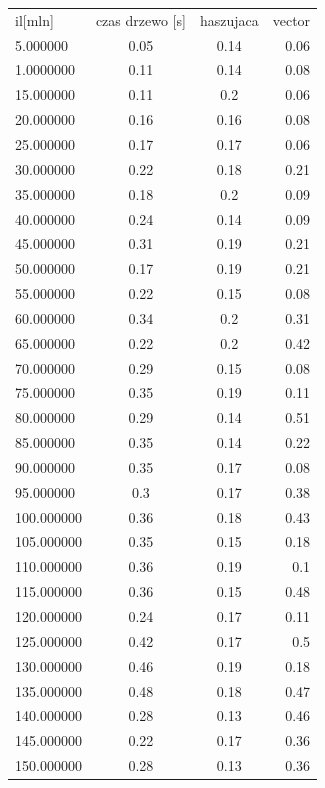 \documentclass[a4paper,11pt]{report}
\begin{document}
\begin{figure}
\begin{center}
          \begin{tabular}{|l|c|c|r|}
\hline
il[mln] & czas drzewo [s] & haszujaca& vector \\
5.000000 & 0.05& 0.14&0.06\\
1.0000000 &  0.11& 0.14& 0.08\\
15.000000  & 0.11& 0.2&0.06\\
20.000000  & 0.16& 0.16&0.08\\
25.000000  & 0.17& 0.17&0.06\\
30.000000  & 0.22& 0.18& 0.21\\
35.000000 &  0.18& 0.2&0.09\\
40.000000  & 0.24& 0.14&0.09\\
45.000000  & 0.31& 0.19&0.21\\
50.000000  & 0.17& 0.19& 0.21\\
55.000000  & 0.22& 0.15&0.08\\
60.000000  & 0.34& 0.2&0.31\\
65.000000  & 0.22& 0.2& 0.42\\
70.000000  & 0.29& 0.15&0.08\\
75.000000  & 0.35& 0.19&0.11\\
80.000000  & 0.29& 0.14& 0.51\\
85.000000  & 0.35& 0.14&0.22\\
90.000000  & 0.35&  0.17&0.08\\
95.000000  & 0.3& 0.17& 0.38\\
100.000000 &  0.36& 0.18&0.43\\
105.000000 &  0.35& 0.15&0.18\\
110.000000 &  0.36& 0.19&0.1\\
115.000000 &  0.36 & 0.15&0.48\\
120.000000 &  0.24& 0.17&0.11\\
125.000000 &  0.42&  0.17&0.5\\
130.000000 &  0.46&  0.19&0.18\\
135.000000 &  0.48& 0.18&0.47\\
140.000000 &  0.28&  0.13&0.46\\
145.000000 &  0.22& 0.17&0.36\\
150.000000 &  0.28&  0.13&0.36\\
\hline


\hline
\end{tabular}
\newline

   

  \end{center}
\end{figure}
\end{document}
